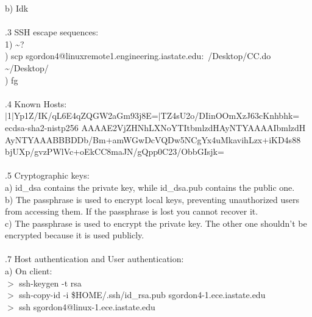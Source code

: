 \documentclass[12pt]{article}
\begin{document}
b) Idk \\

\hrulefill\\

.3 SSH escape sequences: \\

1) \textasciitilde ?\\
) scp sgordon4@linuxremote1.engineering.iastate.edu:~/Desktop/CC.do \textasciitilde /Desktop/\\
) fg\\

\hrulefill\\

.4 Known Hosts:\\

\noindent $|$1$|$Yp1Z/IK/qL6E4qZQGW2aGm93j8E=$|$TZ4sU2o/DIinOOmXzJ63cKnhbhk= ecdsa-sha2-nistp256 AAAAE2VjZHNhLXNoYTItbmlzdHAyNTYAAAAIbmlzdH\\
AyNTYAAABBBDDb/Bm+amWGwDcVQDw5NCgYx4uMkavihLzx+iKD4s88\\
bjUXp/gvzPWlVc+oEkCC8maJN/gQpp0C23/ObbGIsjk=\\

\hrulefill\\

.5 Cryptographic keys:\\

a) id\_dsa contains the private key, while id\_dsa.pub contains the public one.\\

b) The passphrase is used to encrypt local keys, preventing unauthorized users from accessing them. If the passphrase is lost you cannot recover it.\\

c) The passphrase is used to encrypt the private key. The other one shouldn't be encrypted because it is used publicly.\\

\hrulefill\\

.7 Host authentication and User authentication:\\

a) On client:\\
$>$ ssh-keygen -t rsa\\
$>$ ssh-copy-id -i \$HOME/.ssh/id\_rsa.pub sgordon4\@linux-1.ece.iastate.edu\\
$>$ ssh sgordon4@linux-1.ece.iastate.edu\\
\end{document}
